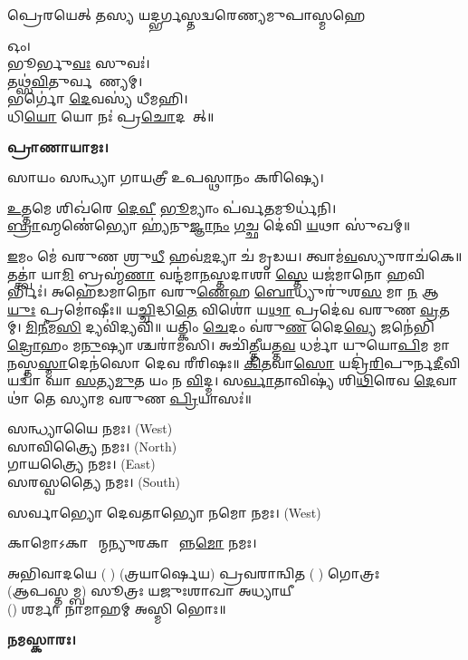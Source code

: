 {𑌪𑍍𑌰𑍇𑌰𑌯𑍇𑌤𑍍 𑌤𑌸𑍍𑌯 𑌯𑌦𑍍𑌭𑌰𑍍𑌗𑌸𑍍𑌤𑌦𑍍𑌵𑌰𑍇𑌣𑍍𑌯𑌮𑍁𑌪𑌾𑌸𑍍𑌮𑌹𑍇}


𑌓𑌂।\\
𑌭𑍂𑌰𑍍𑌭𑍁\ul{𑌵𑌃} 𑌸𑍁𑌵𑌃॑।\\
𑌤𑌥𑍍𑌸॑\ul{𑌵𑌿}𑌤𑍁𑌰𑍍𑌵𑌰𑍇᳚𑌣𑍍𑌯𑌮𑍍।\\
𑌭𑌰𑍍𑌗𑍋॑ \ul{𑌦𑍇}𑌵𑌸𑍍𑌯॑ 𑌧𑍀𑌮𑌹𑌿।\\
𑌧𑌿\ul{𑌯𑍋} 𑌯𑍋 𑌨𑌃॑ 𑌪𑍍𑌰\ul{𑌚𑍋}𑌦𑌯𑌾᳚𑌤𑍍॥

\textbf{𑌪𑍍𑌰𑌾𑌣𑌾𑌯𑌾𑌮𑌃।}


𑌸𑌾𑌯𑌂 𑌸𑌨𑍍𑌧𑍍𑌯𑌾 𑌗𑌾𑌯𑌤𑍍𑌰𑍀 𑌉𑌪𑌸𑍍𑌥𑌾𑌨𑌂 𑌕𑌰𑌿𑌷𑍍𑌯𑍇।

\ul{𑌉}𑌤𑍍𑌤𑌮𑍇 𑌶𑌿𑌖॑𑌰𑍇 \ul{𑌦𑍇}\ul{𑌵𑍀} \ul{𑌭𑍂}𑌮𑍍𑌯𑌾𑌂 𑌪॑𑌰𑍍𑌵\ul{𑌤}𑌮𑍂𑌰𑍍𑌧॑𑌨𑌿।\\
\ul{𑌬𑍍𑌰𑌾}𑌹𑍍𑌮𑌣𑍇॑॑𑌭𑍍𑌯𑍋 𑌹𑍍𑌯॑𑌨𑍁\ul{𑌜𑍍𑌞𑌾}\ul{𑌨𑌂} \ul{𑌗}𑌚𑍍𑌛 𑌦𑍇॑𑌵𑌿 \ul{𑌯}𑌥𑌾 𑌸𑍁॑𑌖𑌮𑍍॥


\ul{𑌇}𑌮𑌂 𑌮𑍇॑ 𑌵𑌰𑍁𑌣 𑌶𑍍𑌰𑍁\ul{𑌧𑍀} 𑌹𑌵॑\ul{𑌮}𑌦𑍍𑌯𑌾 𑌚॑ 𑌮𑍃𑌡𑌯। 𑌤𑍍𑌵𑌾𑌮॑\ul{𑌵}𑌸𑍍𑌯𑍁𑌰𑌾𑌚॑𑌕𑍇॥ 𑌤𑌤𑍍𑌤𑍍𑌵𑌾॑ 𑌯𑌾\ul{𑌮𑌿} 𑌬𑍍𑌰𑌹𑍍𑌮॑\ul{𑌣𑌾} 𑌵𑌨𑍍𑌦॑𑌮𑌾\ul{𑌨}𑌸𑍍𑌤𑌦𑌾𑌶𑌾\ul{𑌸𑍍𑌤𑍇} 𑌯𑌜॑𑌮𑌾𑌨𑍋 \ul{𑌹}𑌵𑌿𑌰𑍍𑌭𑌿𑌃॑। 𑌅𑌹𑍇॑𑌡𑌮𑌾𑌨𑍋 𑌵𑌰𑍁\ul{𑌣𑍇}𑌹 \ul{𑌬𑍋}𑌧𑍍𑌯𑍁𑌰𑍁॑𑌶\ul{𑌸} 𑌮𑌾 \ul{𑌨} 𑌆\ul{𑌯𑍁𑌃} 𑌪𑍍𑌰𑌮𑍋॑𑌷𑍀𑌃॥
𑌯\ul{𑌚𑍍𑌚𑌿}𑌦𑍍𑌧𑌿\ul{𑌤𑍇} 𑌵𑌿𑌶𑍋॑ 𑌯\ul{𑌥𑌾} 𑌪𑍍𑌰𑌦𑍇॑𑌵 𑌵𑌰𑍁𑌣 \ul{𑌵𑍍𑌰}𑌤𑌮𑍍। \ul{𑌮𑌿}\ul{𑌨𑍀}𑌮\ul{𑌸𑌿} 𑌦𑍍𑌯𑌵𑌿॑𑌦𑍍𑌯𑌵𑌿॥ 𑌯𑌤𑍍𑌕𑌿𑌂 \ul{𑌚𑍇}𑌦𑌂 𑌵॑𑌰𑍁\ul{𑌣} 𑌦𑍈\ul{𑌵𑍍𑌯𑍇} 𑌜𑌨𑍇॑𑌭𑌿\ul{𑌦𑍍𑌰𑍋}𑌹𑌂 𑌮\ul{𑌨𑍁}𑌷𑍍𑌯𑌾𑌶𑍍𑌚𑌰𑌾॑𑌮𑌸𑌿। 𑌅𑌚𑌿॑\ul{𑌤𑍍𑌤𑍀}𑌯𑌤𑍍𑌤\ul{𑌵} 𑌧𑌰𑍍𑌮𑌾॑ 𑌯𑍁𑌯𑍋\ul{𑌪𑌿}𑌮 𑌮𑌾 \ul{𑌨}𑌸𑍍𑌤\ul{𑌸𑍍𑌮𑌾}𑌦𑍇𑌨॑𑌸𑍋 𑌦𑍇𑌵 𑌰𑍀𑌰𑌿𑌷𑌃॥ \ul{𑌕𑌿}\ul{𑌤}𑌵𑌾\ul{𑌸𑍋} 𑌯𑌦𑍍𑌰𑌿॑\ul{𑌰𑌿}𑌪𑍁𑌰𑍍𑌨\ul{𑌦𑍀}𑌵𑌿 𑌯𑌦𑍍𑌵𑌾॑ 𑌘𑌾 \ul{𑌸}𑌤𑍍𑌯\ul{𑌮𑍁}𑌤 𑌯𑌂 𑌨 \ul{𑌵𑌿}𑌦𑍍𑌮। 𑌸\ul{𑌰𑍍𑌵𑌾}𑌤𑌾𑌵𑌿𑌷𑍍𑌯॑ 𑌶𑌿\ul{𑌥𑌿}𑌰𑍇𑌵 \ul{𑌦𑍇}𑌵𑌾𑌥𑌾॑ 𑌤𑍇 𑌸𑍍𑌯𑌾𑌮 𑌵𑌰𑍁𑌣 \ul{𑌪𑍍𑌰𑌿}𑌯𑌾𑌸𑌃॑॥


𑌸𑌨𑍍𑌧𑍍𑌯𑌾𑌯𑍈 𑌨𑌮𑌃।  {\scriptsize (West)}\\
𑌸𑌾𑌵𑌿𑌤𑍍𑌰𑍍𑌯𑍈 𑌨𑌮𑌃। {\scriptsize (North)}\\
𑌗𑌾𑌯𑌤𑍍𑌰𑍍𑌯𑍈 𑌨𑌮𑌃।  {\scriptsize (East)}\\
𑌸𑌰𑌸𑍍𑌵𑌤𑍍𑌯𑍈 𑌨𑌮𑌃।  {\scriptsize (South)}

𑌸𑌰𑍍𑌵𑌾𑌭𑍍𑌯𑍋 𑌦𑍇𑌵𑌤𑌾𑌭𑍍𑌯𑍋 𑌨𑌮𑍋 𑌨𑌮𑌃। {\scriptsize (West)}

𑌕𑌾𑌮𑍋𑌽𑌕𑌾𑌰𑍍\mbox{}𑌷𑍀᳚𑌨𑍍𑌮𑌨𑍍𑌯𑍁𑌰𑌕𑌾𑌰𑍍\mbox{}𑌷𑍀᳚𑌨𑍍𑌨\ul{𑌮𑍋} 𑌨𑌮𑌃।

𑌅𑌭𑌿𑌵𑌾𑌦𑌯𑍇 ( ) (𑌤𑍍𑌰𑌯𑌾𑌰𑍍𑌷𑍇𑌯) 𑌪𑍍𑌰𑌵𑌰𑌾𑌨𑍍𑌵𑌿𑌤 ( ) 𑌗𑍋𑌤𑍍𑌰𑌃\\
(𑌆𑌪𑌸𑍍𑌤𑌮𑍍𑌬) 𑌸𑍂𑌤𑍍𑌰𑌃 𑌯𑌜𑍁𑌃𑌶𑌾𑌖𑌾 𑌅𑌧𑍍𑌯𑌾𑌯𑍀\\
() 𑌶𑌰𑍍𑌮𑌾 𑌨𑌾𑌮𑌾𑌹𑌮𑍍 𑌅𑌸𑍍𑌮𑌿 𑌭𑍋𑌃॥

\textbf{𑌨𑌮𑌸𑍍𑌕𑌾𑌰𑌃।}


